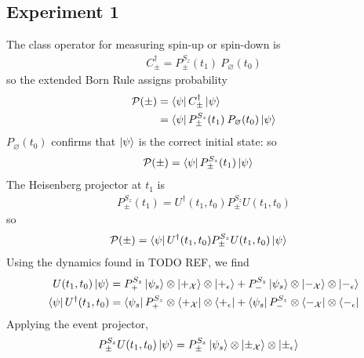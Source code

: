 \subsection{Experiment 1}
The class operator for measuring spin-up or spin-down is
\begin{align}
  C_\pm^\dagger = P^{S_z}_\pm (t_1) \: P_\varnothing (t_0)
\end{align}
so the extended Born Rule assigns probability
\begin{align}
  \mathcal{P}(\pm) &= \bra{\psi} C_\pm^\dagger \ket{\psi} \\ \nonumber
  &= \bra{\psi} P^{S_z}_\pm (t_1) \: P_\varnothing (t_0) \ket{\psi}
\end{align}
$P_\varnothing (t_0)$ confirms that $\ket{\psi}$ is the correct initial state:
so
\begin{align}
  \mathcal{P}(\pm) &= \bra{\psi} P^{S_z}_\pm (t_1) \ket{\psi}
\end{align}
The Heisenberg projector at $t_1$ is
\begin{align}
  P^{S_z}_\pm (t_1) = U^\dagger(t_1, t_0) P^{S_z}_\pm U(t_1, t_0)
\end{align}
so
\begin{align}
  \mathcal{P}(\pm) &= \bra{\psi} U^\dagger(t_1, t_0) P^{S_z}_\pm U(t_1, t_0) \ket{\psi}
\end{align}
Using the dynamics found in TODO REF, we find
\begin{align}
  U(t_1, t_0) \ket{\psi} &= P^{S_z}_+ \ket{\psi_s} \otimes \ket{+_\mathcal{X}} \otimes \ket{+_\epsilon} + P^{S_z}_- \ket{\psi_s} \otimes \ket{-_\mathcal{X}} \otimes \ket{-_\epsilon} \\ \nonumber
  \bra{\psi} U^\dagger(t_1, t_0) &= \bra{\psi_s}P^{S_z}_+ \otimes \bra{+_\mathcal{X}} \otimes \bra{+_\epsilon} + \bra{\psi_s}P^{S_z}_- \otimes \bra{-_\mathcal{X}} \otimes \bra{-_\epsilon}
\end{align}
Applying the event projector,
\begin{align}
  P^{S_z}_\pm U(t_1, t_0) \ket{\psi} &= P^{S_z}_\pm \ket{\psi_s} \otimes \ket{\pm_\mathcal{X}} \otimes \ket{\pm_\epsilon}
\end{align}
